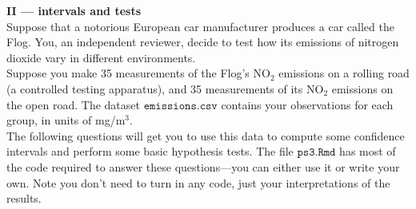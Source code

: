 \documentclass[10pt]{extarticle}
\begin{document}
\hfill 




{\Large \bf II --- intervals and tests} \\ 

Suppose that a notorious European car manufacturer produces a car called the Flog. You, an independent reviewer, decide to test how its emissions of nitrogen dioxide vary in different environments. \\ 

Suppose you make 35 measurements of the Flog's NO$_2$ emissions on a rolling road (a controlled testing apparatus), and 35 measurements of its NO$_2$ emissions on the open road. The dataset $\texttt{emissions.csv}$ contains your observations for each group, in units of mg/m$^3$. \\ 

The following questions will get you to use this data to compute some confidence intervals and perform some basic hypothesis tests. The file $\texttt{ps3.Rmd}$ has most of the code required to answer these questions---you can either use it or write your own. Note you don't need to turn in any code, just your interpretations of the results.   

\hfill  
\end{document}

